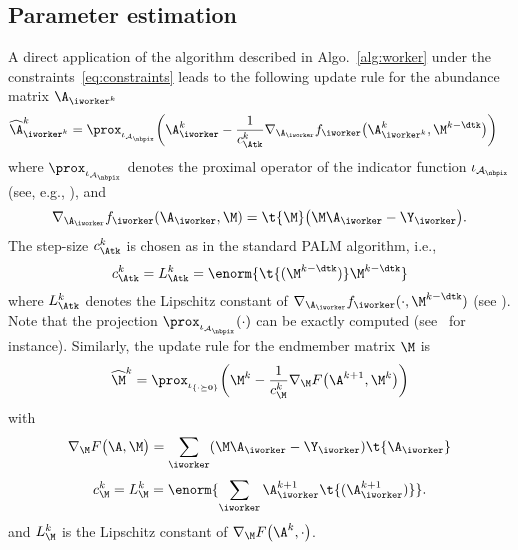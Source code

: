 \documentclass[journal,final,letterpaper,twoside,twocolumn]{IEEEtran}
\begin{document}
    \subsection{Parameter estimation} \label{sec:parameter_estimation}

A direct application of the algorithm described in Algo.~\ref{alg:worker} under the constraints~\eqref{eq:constraints} leads to the following update rule for the abundance matrix $\A_{\iworker^k}$
%
\begin{align}
    \label{eq:update_A}
    \widehat{\A}_{\iworker^k}^k &= \prox_{\iota_{\mathcal{A}_\nbpix}} \biggl( \A_\iworker^{k} - \frac{1}{c_{\Atk}^k} \nabla_{\A_\iworker} f_\iworker \bigl(\A_{\iworker^k}^k,\M^{k - \dtk} \bigr)\biggr)
\end{align}
%
where $\prox_{\iota_{\mathcal{A}_\nbpix}}$ denotes the proximal operator of the indicator function $\iota_{\mathcal{A}_\nbpix}$ (see, e.g., \cite{Combettes2011}), and
%
\begin{equation}
    \nabla_{\A_\iworker} f_\iworker(\A_\iworker,\M) = \t{\M} \bigl(\M\A_\iworker - \Y_\iworker \bigr).
\end{equation}
%
The step-size $c_{\Atk}^k$  is chosen as in the standard PALM algorithm, i.e.,
%
\begin{equation}
    c_{\Atk}^k = L_{\Atk}^k = \enorm{\t{(\M^{k - \dtk})} \M^{k - \dtk}}
\end{equation}
%
where $L_{\Atk}^k$ denotes the Lipschitz constant of $\nabla_{\A_\iworker} f_\iworker(\cdot,\M^{k-\dtk})$ (see \cite[Remark 4 (iv)]{Bolte2013}).
%
Note that the projection $\prox_{\iota_{\mathcal{A}_\nbpix}}(\cdot)$ can be exactly computed (see~\cite{Duchi2008,Condat2015} for instance). Similarly, the update rule for the endmember matrix $\M$ is
%
\begin{equation}
    \label{eq:update_M}
    \widehat{\M}^k = \prox_{\iota_{\{ \cdot \succeq \mathbf{0} \}}} \biggl(\M^k - \frac{1}{c_\M^k} \nabla_{\M} F\bigl( \A^{k+1},\M^k \bigr) \biggr)
\end{equation}
%
with
%
\begin{equation}
    \nabla_{\M} F \bigl(\A,\M \bigr) = \sum_\iworker (\M \A_\iworker - \Y_\iworker) \t{\A_\iworker}
\end{equation}
%
\begin{equation}
    c_\M^k = L_\M^k = \enorm{\sum_\iworker \A_\iworker^{k+1} \t{(\A_\iworker^{k+1})}}.
\end{equation}
%
and $L_\M^k$ is the Lipschitz constant of $\nabla_{\M} F \bigl(\A^k,\cdot \bigr)$.
\end{document}
